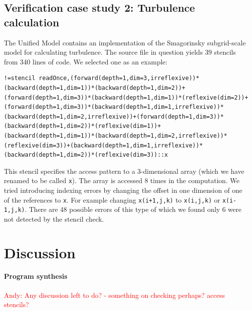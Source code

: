 \documentclass[9pt]{sigplanconf}
\newcommand{\anote}[1]{\textcolor{red}{Andy: #1}}
\theoremstyle{definition}
\begin{document}
\subsection{Verification case study 2: Turbulence calculation}

The Unified Model contains an implementation of the Smagorinsky subgrid-scale model for calculating turbulence. The source file in question yields 39 stencils from 340 lines of code. We selected one as an example:

\begin{verbatim}
!=stencil readOnce,(forward(depth=1,dim=3,irreflexive))*(backward(depth=1,dim=1))*(backward(depth=1,dim=2))+(forward(depth=1,dim=3))*(backward(depth=1,dim=1))*(reflexive(dim=2))+(forward(depth=1,dim=3))*(backward(depth=1,dim=1,irreflexive))*(backward(depth=1,dim=2,irreflexive))+(forward(depth=1,dim=3))*(backward(depth=1,dim=2))*(reflexive(dim=1))+(backward(depth=1,dim=1))*(backward(depth=1,dim=2,irreflexive))*(reflexive(dim=3))+(backward(depth=1,dim=1,irreflexive))*(backward(depth=1,dim=2))*(reflexive(dim=3))::x
\end{verbatim}

This stencil specifies the access pattern to a 3-dimensional array (which we have renamed to be called \texttt{x}). The array is accessed 8 times in the computation. We tried introducing indexing errors by changing the offset in one dimension of one of the references to \texttt{x}. For example changing \texttt{x(i+1,j,k)} to \texttt{x(i,j,k)} or \texttt{x(i-1,j,k)}. There are 48 possible errors of this type of which we found only 6 were not detected by the stencil check.

\section{Discussion}
\label{sec:discussion}

\paragraph{Program synthesis}



\anote{Any discussion left to do? - something on checking perhaps? access stencils?}
\end{document}
